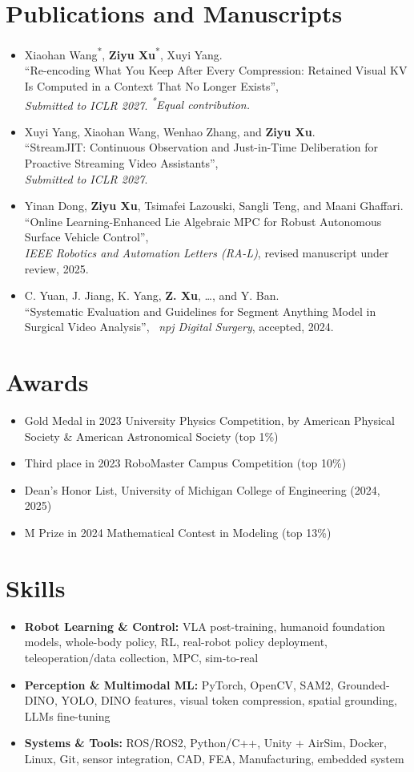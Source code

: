\documentclass[11pt,letterpaper]{article}
\newcommand{\resumeItem}[1]{
    \item #1
}
\begin{document}
\section*{Publications and Manuscripts}
\begin{itemize}[leftmargin=1.4em, itemsep=3pt, topsep=2pt]
    \item Xiaohan Wang\textsuperscript{*}, \textbf{Ziyu Xu}\textsuperscript{*}, Xuyi Yang. \\
    ``Re-encoding What You Keep After Every Compression: Retained Visual KV Is Computed in a Context That No Longer Exists'', \\
    \textit{Submitted to ICLR 2027}. \textit{\textsuperscript{*}Equal contribution.}
    \item Xuyi Yang, Xiaohan Wang, Wenhao Zhang, and \textbf{Ziyu Xu}. \\
    ``StreamJIT: Continuous Observation and Just-in-Time Deliberation for Proactive Streaming Video Assistants'', \\
    \textit{Submitted to ICLR 2027}.
    \item Yinan Dong, \textbf{Ziyu Xu}, Tsimafei Lazouski, Sangli Teng, and Maani Ghaffari. \\
    ``Online Learning-Enhanced Lie Algebraic MPC for Robust Autonomous Surface Vehicle Control'', \\
    \textit{IEEE Robotics and Automation Letters (RA-L)}, revised manuscript under review, 2025.
    \item C. Yuan, J. Jiang, K. Yang, \textbf{Z. Xu}, \ldots, and Y. Ban. \\
    ``Systematic Evaluation and Guidelines for Segment Anything Model in Surgical Video Analysis'', \
    \textit{npj Digital Surgery}, accepted, 2024.
    
\end{itemize}
\section*{Awards}
\begin{itemize}
    \resumeItem{Gold Medal in 2023 University Physics Competition, by American Physical Society \& American Astronomical Society (top 1\%)}
    \resumeItem{Third place in 2023 RoboMaster Campus Competition (top 10\%)}
    \resumeItem{Dean's Honor List, University of Michigan College of Engineering (2024, 2025)}
    \resumeItem{M Prize in 2024 Mathematical Contest in Modeling (top 13\%)}
\end{itemize}
\section*{Skills}
\begin{itemize}
\resumeItem{\textbf{Robot Learning \& Control:} VLA post-training, humanoid foundation models, whole-body policy, RL, real-robot policy deployment, teleoperation/data collection, MPC, sim-to-real}
\resumeItem{\textbf{Perception \& Multimodal ML:} PyTorch, OpenCV, SAM2, Grounded-DINO, YOLO, DINO features, visual token compression, spatial grounding, LLMs fine-tuning}
\resumeItem{\textbf{Systems \& Tools:} ROS/ROS2, Python/C++, Unity + AirSim, Docker, Linux, Git, sensor integration, CAD, FEA, Manufacturing, embedded system}
\end{itemize}
\end{document}
